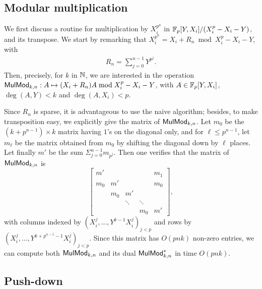 
\subsection{Modular multiplication}
\label{ssec:mulmod}

We first discuss a routine for multiplication by $X_i^{p^n}$
in $\mathbb{F}_p[Y,X_i]/(X_i^p-X_i-Y)$, and its transpose. We start by
remarking that $X_i^{p^n}=X_i+R_n \bmod X_i^p-X_i-Y$, with
\begin{equation}
  \label{eq:Kn}
 \begin{array}{c}R_n = \sum_{j=0}^{n-1}
  Y^{p^j}.
\end{array}
\end{equation}
Then, precisely, for $k$ in $\mathbb{N}$, we are interested in the operation
${\sf MulMod}_{k,n}: A \mapsto (X_i+R_n)A \bmod X_i^p-X_i-Y$,
with $A\in \mathbb{F}_p[Y,X_i]$, $\deg(A,Y) < k$ and $\deg(A,X_i) <p$.

Since $R_n$ is sparse, it is advantageous to use the naive algorithm;
besides, to make transposition easy, we explicitly give the matrix of
${\sf MulMod}_{k,n}$. Let $m_0$ be the $(k+p^{n-1})\times k$ matrix
having $1$'s on the diagonal only, and for $\ell \le p^{n-1}$, let
$m_\ell$ be the matrix obtained from $m_0$ by shifting the diagonal
down by $\ell$ places. Let finally $m'$ be the sum $\Sigma_{j=0}^{n-1}
m_{p^j}$. Then one verifies that the matrix of ${\sf MulMod}_{k,n}$
is $$\left [
\begin{matrix}
m'  &     &        &        & m_1 \\
m_0 & m'  &        &        & m_0 \\
    & m_0 & m'     &        &     \\
    &     & \ddots & \ddots &     \\
    &     &        & m_0    & m'
\end{matrix}
\right ],$$ with columns indexed by 
$(X_i^j,\dots,Y^{k-1}X_i^j)_{j < p}$ and rows by
$(X_i^j,\dots,Y^{k+p^{n-1}-1}X_i^j)_{j < p}$.  Since this matrix
has $O(pnk)$ non-zero entries,  we can compute both 
${\sf MulMod}_{k,n}$ and its dual ${\sf MulMod}_{k,n}^\ast$ in time $O(pnk)$.



\subsection{Push-down}\label{sec:level-embedding:push-down}

